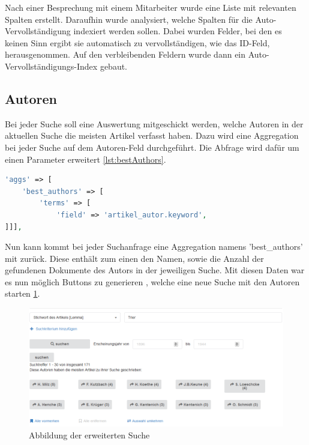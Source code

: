 Nach einer Besprechung mit einem Mitarbeiter wurde eine Liste mit relevanten Spalten erstellt. Daraufhin wurde analysiert, welche Spalten für die Auto-Vervollständigung indexiert werden sollen. Dabei wurden Felder, bei den es keinen Sinn ergibt sie automatisch zu vervollständigen, wie das ID-Feld, herausgenommen. Auf den verbleibenden Feldern wurde dann ein Auto-Vervollständigungs-Index gebaut.

\subsection{Autoren}

Bei jeder Suche soll eine Auswertung mitgeschickt werden, welche Autoren in der aktuellen Suche die meisten Artikel verfasst haben. Dazu wird eine Aggregation bei jeder Suche auf dem Autoren-Feld durchgeführt. Die Abfrage wird dafür um einen Parameter erweitert \ref{lst:bestAuthors}.

\begin{lstlisting}[language=PHP, frame=single, label={lst:bestAuthors}] 
'aggs' => [
    'best_authors' => [
        'terms' => [
            'field' => 'artikel_autor.keyword',
]]],
\end{lstlisting}


Nun kann kommt bei jeder Suchanfrage eine Aggregation namens 'best\_authors' mit zurück. Diese enthält zum einen den Namen, sowie die Anzahl der gefundenen Dokumente des Autors in der jeweiligen Suche. 
Mit diesen Daten war es nun möglich Buttons zu generieren   , welche eine neue Suche mit den Autoren starten \ref{img:erweiterteSuche}.


\begin{figure}
	\centering
	\includegraphics[width=1\linewidth]{images/best_authors.png}
	\caption{Abbildung der erweiterten Suche}
	\label{img:erweiterteSuche}
\end{figure}
